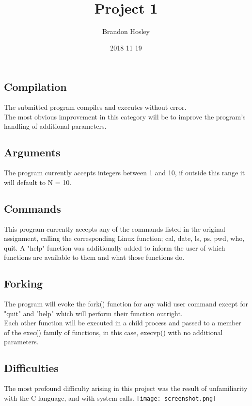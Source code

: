 \documentclass[a4paper,man,natbib]{apa6}
\title{Project 1}
\author{Brandon Hosley}
\date{2018 11 19}
\affiliation{Chung-Wei Lee}
\begin{document}
\maketitle
\subsection{Compilation}
The submitted program compiles and executes without error. \\
The most obvious improvement in this category will be to improve the program's handling of additional parameters.
\subsection{Arguments}
The program currently accepts integers between 1 and 10, if outside this range it will default to N = 10.
\subsection{Commands}
This program currently accepts any of the commands listed in the original assignment, calling the corresponding Linux function; cal, date, ls, ps, pwd, who, quit. A "help" function was additionally added to inform the user of which functions are available to them and what those functions do. 
\subsection{Forking}
The program will evoke the fork() function for any valid user command except for "quit" and "help" which will perform their function outright. \\
Each other function will be executed in a child process and passed to a member of the exec() family of functions, in this case, execvp() with no additional parameters.
\subsection{Difficulties}
The most profound difficulty arising in this project was the result of unfamiliarity with the C language, and with system calls. 
\clearpage
\texttt{[image: screenshot.png]}

%
\end{document}
